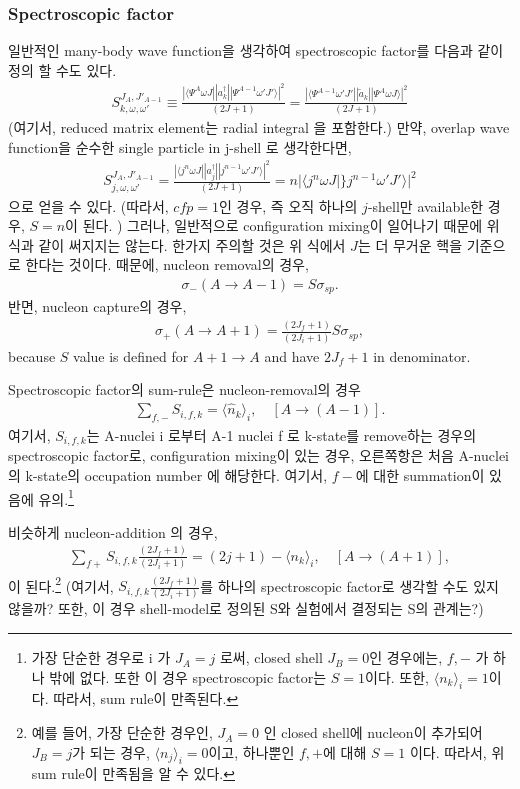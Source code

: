 \documentclass[11pt]{book}
\def\la{\langle}
\def\ra{\rangle}
\newcommand{\bea}{\begin{eqnarray}}
\newcommand{\eea}{\end{eqnarray}}
\begin{document}
\subsubsection{Spectroscopic factor} 
일반적인 many-body wave function을 생각하여 spectroscopic factor를 
다음과 같이 정의 할 수도 있다. 
\bea 
S^{J_A,J'_{A-1}}_{k,\omega,\omega'}\equiv 
    \frac{|\la \Psi^A \omega J|| a^\dagger_k ||\Psi^{A-1}\omega' J'\ra|^2}{(2J+1)}
   =\frac{|\la \Psi^{A-1} \omega' J'|| \tilde{a}_k ||\Psi^{A}\omega J\ra|^2}{(2J+1)}  
\eea 
(여기서, reduced matrix element는 radial integral 을 포함한다.)
만약, overlap wave function을 순수한 single particle in j-shell 로 생각한다면,
\bea 
S^{J_A,J'_{A-1}}_{j ,\omega,\omega'}=
  \frac{|\la j^n \omega J|| a^\dagger_j ||j^{n-1}\omega' J'\ra|^2}{(2J+1)}
  =n|\la j^n \omega J |\} j^{n-1} \omega' J'\ra|^2
\eea 
으로 얻을 수 있다. (따라서, $cfp=1$인 경우, 즉 오직 하나의 $j$-shell만 available한 경우,
$S=n$이 된다. )
그러나, 일반적으로 configuration mixing이 일어나기 때문에 위 식과 같이 써지지는 않는다. 
한가지 주의할 것은 위 식에서 $J$는 더 무거운 핵을 기준으로 한다는 것이다. 때문에,
nucleon removal의 경우,
\bea 
\sigma_{-}(A\to A-1)= S \sigma_{sp}.
\eea 
반면, nucleon capture의 경우,
\bea 
\sigma_{+}(A \to A+1) = \frac{(2J_f+1)}{(2J_i+1)} S \sigma_{sp}, 
\eea 
because $S$ value is defined for $A+1\to A$ and have $2J_f+1$ in denominator.

Spectroscopic factor의 sum-rule은 nucleon-removal의 경우
\bea 
\sum_{f,-} S_{i,f,k} =\la \hat{n}_k\ra_i, \quad [A\to (A-1)].
\eea 
여기서, $S_{i,f,k}$는 A-nuclei  i 로부터 A-1 nuclei f 로 k-state를 remove하는 
경우의 spectroscopic factor로, configuration mixing이 있는 경우, 
오른쪽항은 처음 A-nuclei 의 k-state의 occupation number 에 해당한다. 여기서,
$f-$에 대한 summation이 있음에 유의.\footnote{
가장 단순한 경우로 i 가 $J_A=j$ 로써, closed shell $J_B=0$인 경우에는, $f,-$ 가 하나 밖에
없다. 또한 이 경우 spectroscopic factor는 $S=1$이다. 또한, $\la n_k\ra_i=1$이다. 
따라서, sum rule이 만족된다.
}
 
비슷하게 nucleon-addition 의 경우,
\bea 
\sum_{f+} S_{i,f,k}\frac{(2J_f+1)}{(2J_i+1)}= (2j+1)-\la n_k\ra_i,\quad [A\to (A+1)], 
\eea  
이 된다.\footnote{예를 들어, 가장 단순한 경우인, $J_A=0$ 인 closed shell에 nucleon이 추가되어
$J_B=j$가 되는 경우, $\la n_j\ra_i=0$이고, 하나뿐인 $f,+$에 대해 $S=1$ 이다. 따라서,
위 sum rule이 만족됨을 알 수 있다. 
}  
(여기서, $S_{i,f,k}\frac{(2J_f+1)}{(2J_i+1)}$를 하나의 spectroscopic factor로 생각할 수도 있지 않을까? 
또한, 이 경우 shell-model로 정의된 S와 실험에서 결정되는 S의 관계는?) 
\end{document}
